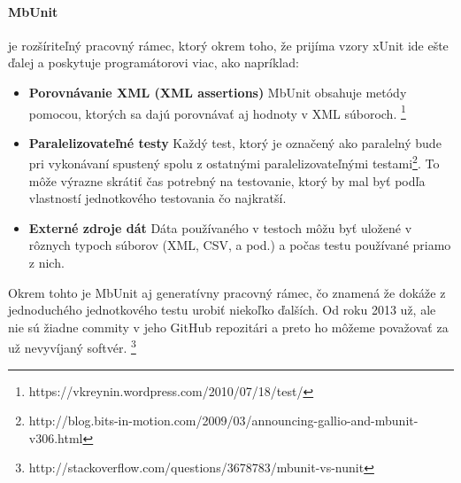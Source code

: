 \documentclass[11pt,twoside,slovak,a4paper]{article}
\begin{document}
			\paragraph{MbUnit} je rozšíriteľný pracovný rámec, ktorý okrem toho, že prijíma vzory xUnit ide ešte ďalej a poskytuje programátorovi viac, ako napríklad:
			\begin{itemize}
				\item \textbf{Porovnávanie XML (XML assertions)} MbUnit obsahuje metódy pomocou, ktorých sa dajú porovnávať aj hodnoty v XML súboroch. \footnote{https://vkreynin.wordpress.com/2010/07/18/test/}
				\item \textbf{Paralelizovateľné testy} Každý test, ktorý je označený ako paralelný bude pri vykonávaní spustený spolu z ostatnými paralelizovateľnými testami\footnote{http://blog.bits-in-motion.com/2009/03/announcing-gallio-and-mbunit-v306.html}. To môže výrazne skrátiť čas potrebný na testovanie, ktorý by mal byť podľa vlastností jednotkového testovania čo najkratší. 
				\item \textbf{Externé zdroje dát} Dáta používaného v testoch môžu byť uložené v rôznych typoch súborov (XML, CSV, a pod.) a počas testu používané priamo z nich.
			\end{itemize}
			Okrem tohto je MbUnit aj generatívny pracovný rámec, čo znamená že dokáže z jednoduchého jednotkového testu urobiť niekoľko ďalších. Od roku 2013 už, ale nie sú žiadne commity v jeho GitHub repozitári a preto ho môžeme považovať za už nevyvíjaný softvér. \footnote{http://stackoverflow.com/questions/3678783/mbunit-vs-nunit}
			
\end{document}
